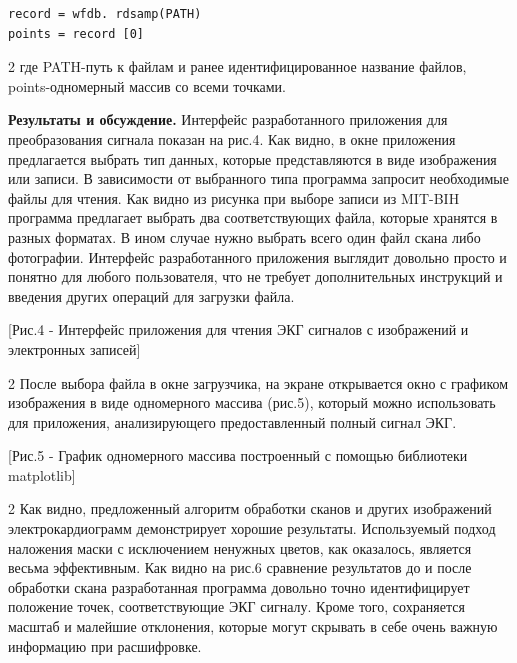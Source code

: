{\small
\begin{verbatim}
record = wfdb. rdsamp(PATH)
points = record [0]
\end{verbatim}
}

\begin{multicols}{2}
где PATH-путь к файлам и ранее идентифицированное название файлов,
points-одномерный массив со всеми точками.

{\bfseries Результаты и обсуждение.} Интерфейс разработанного приложения
для преобразования сигнала показан на рис.4. Как видно, в окне
приложения предлагается выбрать тип данных, которые представляются в
виде изображения или записи. В зависимости от выбранного типа программа
запросит необходимые файлы для чтения. Как видно из рисунка при выборе
записи из MIT-BIH программа предлагает выбрать два соответствующих
файла, которые хранятся в разных форматах. В ином случае нужно выбрать
всего один файл скана либо фотографии. Интерфейс разработанного
приложения выглядит довольно просто и понятно для любого пользователя,
что не требует дополнительных инструкций и введения других операций для
загрузки файла.
\end{multicols}

[Рис.4 - Интерфейс приложения для чтения ЭКГ сигналов с
изображений и электронных записей]

\begin{multicols}{2}
После выбора файла в окне загрузчика, на экране открывается окно с
графиком изображения в виде одномерного массива (рис.5), который можно
использовать для приложения, анализирующего предоставленный полный
сигнал ЭКГ.
\end{multicols}

[Рис.5 - График одномерного массива построенный с
помощью библиотеки matplotlib]

\begin{multicols}{2}
Как видно, предложенный алгоритм обработки сканов и других изображений
электрокардиограмм демонстрирует хорошие результаты. Используемый подход
наложения маски с исключением ненужных цветов, как оказалось, является
весьма эффективным. Как видно на рис.6 сравнение результатов до и после
обработки скана разработанная программа довольно точно идентифицирует
положение точек, соответствующие ЭКГ сигналу. Кроме того, сохраняется
масштаб и малейшие отклонения, которые могут скрывать в себе очень
важную информацию при расшифровке.
\end{multicols}


